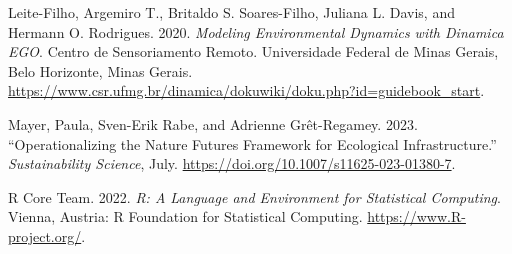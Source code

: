\documentclass[
  letterpaper,
  DIV=11,
  numbers=noendperiod]{scrreprt}
\newlength{\cslhangindent}
\newenvironment{CSLReferences}[2] %
 {\begin{list}{}{%
  \setlength{\itemindent}{0pt}
  \setlength{\leftmargin}{0pt}
  \setlength{\parsep}{0pt}
  \ifodd #1
   \setlength{\leftmargin}{\cslhangindent}
   \setlength{\itemindent}{-1\cslhangindent}
  \fi
  \setlength{\itemsep}{#2\baselineskip}}}
 {\end{list}}
\begin{document}
\begin{CSLReferences}{1}{0}
Leite-Filho, Argemiro T., Britaldo S. Soares-Filho, Juliana L. Davis,
and Hermann O. Rodrigues. 2020. \emph{Modeling Environmental Dynamics
with Dinamica EGO}. Centro de Sensoriamento Remoto. Universidade Federal
de Minas Gerais, Belo Horizonte, Minas Gerais.
\url{https://www.csr.ufmg.br/dinamica/dokuwiki/doku.php?id=guidebook_start}.

Mayer, Paula, Sven-Erik Rabe, and Adrienne Grêt-Regamey. 2023.
{``Operationalizing the {Nature Futures Framework} for Ecological
Infrastructure.''} \emph{Sustainability Science}, July.
\url{https://doi.org/10.1007/s11625-023-01380-7}.

R Core Team. 2022. \emph{R: A Language and Environment for Statistical
Computing}. Vienna, Austria: R Foundation for Statistical Computing.
\url{https://www.R-project.org/}.

\end{CSLReferences}
\end{document}
